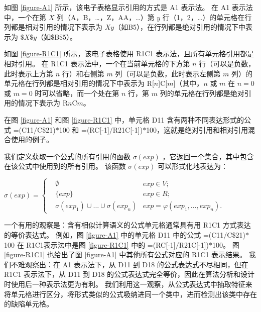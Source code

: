 

如图 \ref{figure-A1} 所示，该电子表格显示引用的方式是 A1 表示法。
在 A1 表示法中，一个在第 $X$ 列（A，B，\dots，Z，AA，\dots）第 $y$ 行（1，2，\dots）的单元格在行列都是相对引用的情况下表示为 $Xy$（如B5），在行列都是绝对引用的情况下中表示为 $\$X\$y$（如\$B\$5）。



如图 \ref{figure-R1C1} 所示，该电子表格使用 R1C1 表示法，且所有单元格引用都是相对引用。
在 R1C1 表示法中，一个在当前单元格的下方第 $n$ 行（可以是负数，此时表示上方第 $n$ 行）和右侧第 $m$ 列（可以是负数，此时表示左侧第 $m$ 列）的单元格在行列都是相对引用的情况下中表示为 R[$n$]C[$m$]（其中，$n$ 或 $m$ 在 $n=0$ 或 $m=0$ 时可以省略，而一个处在第 $n$ 行，第 $m$ 列的单元格在行列都是绝对引用的情况下表示为 R$n$C$m$。

在图 \ref{figure-A1} 和图 \ref{figure-R1C1} 中，单元格 D11 含有两种不同表达形式的公式 =(C11$/$C\$21)$*$100 和 =(RC[-1]$/$R21C[-1])$*$100，这就是绝对引用和相对引用混合使用的例子。

我们定义获取一个公式的所有引用的函数 $\sigma(exp)$ ，它返回一个集合，其中包含在该公式中使用到的所有引用。
该函数 $\sigma(exp)$ 可以形式化地表达为：
\begin{definition}
$
\sigma(exp) = 
\left\{
    \begin{aligned}
       & \emptyset & exp \in V; \\
       & \{exp\}     & exp \in R; \\
       & \sigma(exp_1) \cup \dots \cup \sigma(exp_n) & exp = \varphi(exp_1, \dots , exp_n).
    \end{aligned}
\right.
$
\end{definition}

一个有用的观察是：含有相似计算语义的公式单元格通常具有用 R1C1 方式表达的等价表达式。
例如，图 \ref{figure-A1} 中的单元格 D11 中的公式 =(C11$/$C\$21)$*$100 在 R1C1表示法中是图 \ref{figure-R1C1} 中的 =(RC[-1]$/$R21C[-1])$*$100。
图 \ref{figure-R1C1} 也给出了图 \ref{figure-A1} 中其他所有公式对应的 R1C1 表示结果。
我们不难观察出：在 A1 表示法下，从 D11 到 D18 的公式表达式不尽相同，但在 R1C1 表示法下，从 D11 到 D18 的公式表达式完全等价，因此在算法分析和设计时使用后一种表示法更为有利。
我们利用这一观察，从公式表达式中抽取特征来将单元格进行区分，将形式类似的公式吸纳进同一个类中，进而检测出该类中存在的缺陷单元格。




